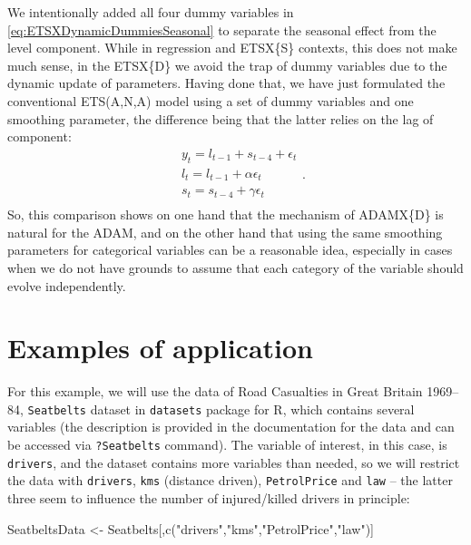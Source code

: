 \documentclass[
]{book}
\newenvironment{Shaded}{\begin{snugshade}}{\end{snugshade}}
\newcommand{\FunctionTok}[1]{\textcolor[rgb]{0.00,0.00,0.00}{#1}}
\newcommand{\NormalTok}[1]{#1}
\newcommand{\OtherTok}[1]{\textcolor[rgb]{0.56,0.35,0.01}{#1}}
\newcommand{\StringTok}[1]{\textcolor[rgb]{0.31,0.60,0.02}{#1}}
\theoremstyle{definition}
\theoremstyle{definition}
\theoremstyle{definition}
\theoremstyle{definition}
\theoremstyle{remark}
\begin{document}
We intentionally added all four dummy variables in \eqref{eq:ETSXDynamicDummiesSeasonal} to separate the seasonal effect from the level component. While in regression and ETSX\{S\} contexts, this does not make much sense, in the ETSX\{D\} we avoid the trap of dummy variables due to the dynamic update of parameters. Having done that, we have just formulated the conventional ETS(A,N,A) model using a set of dummy variables and one smoothing parameter, the difference being that the latter relies on the lag of component:
\begin{equation}
  \begin{aligned}
    & y_{t} = l_{t-1} + s_{t-4} + \epsilon_t \\
    & l_t = l_{t-1} + \alpha \epsilon_t \\
    & s_t = s_{t-4} + \gamma \epsilon_t \\
  \end{aligned} .
  \label{eq:ADAMETSANAQuarterly}
\end{equation}
So, this comparison shows on one hand that the mechanism of ADAMX\{D\} is natural for the ADAM, and on the other hand that using the same smoothing parameters for categorical variables can be a reasonable idea, especially in cases when we do not have grounds to assume that each category of the variable should evolve independently.

\hypertarget{ETSXRExample}{%
\section{Examples of application}\label{ETSXRExample}}

For this example, we will use the data of Road Casualties in Great Britain 1969--84, \texttt{Seatbelts} dataset in \texttt{datasets} package for R, which contains several variables (the description is provided in the documentation for the data and can be accessed via \texttt{?Seatbelts} command). The variable of interest, in this case, is \texttt{drivers}, and the dataset contains more variables than needed, so we will restrict the data with \texttt{drivers}, \texttt{kms} (distance driven), \texttt{PetrolPrice} and \texttt{law} -- the latter three seem to influence the number of injured/killed drivers in principle:

\begin{Shaded}
\begin{Highlighting}[]
\NormalTok{SeatbeltsData }\OtherTok{\textless{}{-}}\NormalTok{ Seatbelts[,}\FunctionTok{c}\NormalTok{(}\StringTok{"drivers"}\NormalTok{,}\StringTok{"kms"}\NormalTok{,}\StringTok{"PetrolPrice"}\NormalTok{,}\StringTok{"law"}\NormalTok{)]}
\end{Highlighting}
\end{Shaded}
\end{document}
